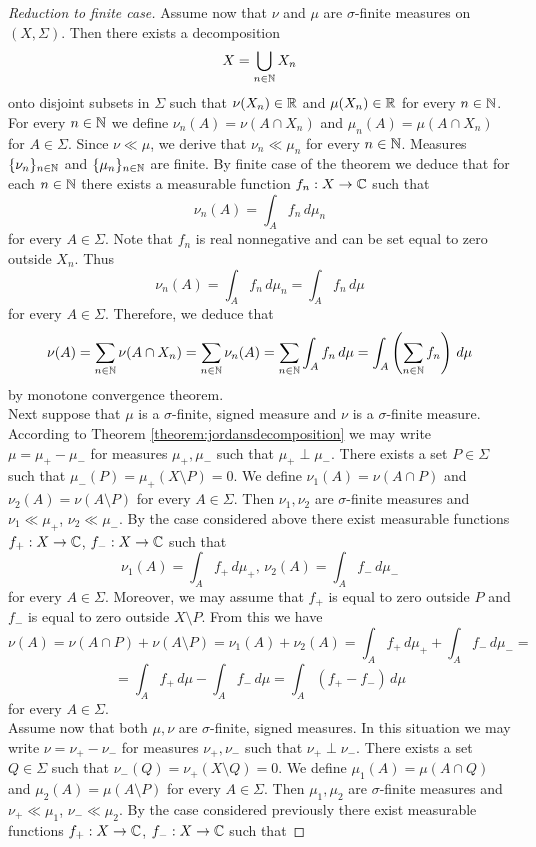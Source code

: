 \begin{proof}[Reduction to finite case]
Assume now that $\nu$ and $\mu$ are $\sigma$-finite measures on $(X,\Sigma)$. Then there exists a decomposition
$$X= \bigcup_{n\in {\mathbb N}}X_n$$
onto disjoint subsets in $\Sigma$ such that $\nu(X_n)\in {\mathbb R}$ and $\mu(X_n)\in {\mathbb R}$ for every $n\in {\mathbb N}$. For every $n\in {\mathbb N}$ we define $\nu_n(A) = \nu(A\cap X_n)$ and $\mu_n(A) = \mu(A\cap X_n)$ for $A\in \Sigma$. Since $\nu \ll \mu$, we derive that $\nu_n\ll \mu_n$ for every $n\in {\mathbb N}$. Measures $\{\nu_n\}_{n\in {\mathbb N}}$ and $\{\mu_n\}_{n\in {\mathbb N}}$ are finite. By finite case of the theorem we deduce that for each $n\in {\mathbb N}$ there exists a measurable function $f_n:X\rightarrow {\mathbb C}$ such that
$$\nu_n(A) = \int_A f_n\,d\mu_n$$
for every $A\in \Sigma$. Note that $f_n$ is real nonnegative and can be set equal to zero outside $X_n$. Thus
$$\nu_n(A) = \int_A f_n\,d\mu_n = \int_A f_n\,d\mu$$
for every $A\in \Sigma$. Therefore, we deduce that
$$\nu(A) = \sum_{n\in {\mathbb N}}\nu(A\cap X_n) = \sum_{n\in {\mathbb N}}\nu_n(A) =\sum_{n\in {\mathbb N}}\int_Af_n\,d\mu = \int_A \left(\sum_{n\in {\mathbb N}}f_n\right)\,d\mu$$
by monotone convergence theorem.\\
Next suppose that $\mu$ is a $\sigma$-finite, signed measure and $\nu$ is a $\sigma$-finite measure. According to Theorem \ref{theorem:jordansdecomposition} we may write $\mu = \mu_+ - \mu_-$ for measures $\mu_+,\mu_-$ such that $\mu_+\perp \mu_-$. There exists a set $P\in \Sigma$ such that $\mu_-(P)=\mu_+(X\setminus P)=0$. We define $\nu_1(A) = \nu(A\cap P)$ and $\nu_2(A) = \nu(A\setminus P)$ for every $A\in \Sigma$. Then $\nu_1, \nu_2$ are $\sigma$-finite measures and $\nu_1 \ll \mu_+$, $\nu_2\ll \mu_-$. By the case considered above there exist measurable functions $f_+:X\rightarrow {\mathbb C}$, $f_-:X\rightarrow {\mathbb C}$ such that
$$\nu_1(A) = \int_Af_+\,d\mu_+,\,\nu_2(A) = \int_Af_-\,d\mu_-$$
for every $A\in \Sigma$. Moreover, we may assume that  $f_+$ is equal to zero outside $P$ and $f_-$ is equal to zero outside $X\setminus P$. From this we have
$$\nu(A) = \nu(A\cap P) + \nu(A\setminus P) = \nu_1(A) + \nu_2(A) = \int_Af_+\,d\mu_+ + \int_Af_-\,d\mu_- =$$
$$=\int_Af_+\,d\mu - \int_Af_-\,d\mu = \int_A\left(f_+-f_-\right)\,d\mu $$
for every $A\in \Sigma$.\\
Assume now that both $\mu, \nu$ are $\sigma$-finite, signed measures. In this situation we may write $\nu = \nu_+-\nu_-$ for measures $\nu_+, \nu_-$ such that $\nu_+\perp \nu_-$. There exists a set $Q\in \Sigma$ such that $\nu_-(Q)=\nu_+(X\setminus Q)=0$. We define $\mu_1(A) = \mu(A\cap Q)$ and $\mu_2(A) = \mu(A\setminus P)$ for every $A\in \Sigma$. Then $\mu_1, \mu_2$ are $\sigma$-finite measures and $\nu_+ \ll \mu_1$, $\nu_-\ll \mu_2$. By the case considered previously there exist measurable functions $f_+:X\rightarrow {\mathbb C}$, $f_-:X\rightarrow {\mathbb C}$ such that

\end{proof}
